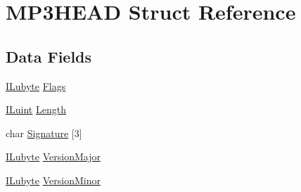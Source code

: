 \hypertarget{struct_m_p3_h_e_a_d}{\section{M\-P3\-H\-E\-A\-D Struct Reference}
\label{struct_m_p3_h_e_a_d}
}
\subsection*{Data Fields}
\begin{DoxyCompactItemize}
\item 
\hyperlink{il_8h_a8d2f04500100a86d1b00e98ab1b15a33}{I\-Lubyte} \hyperlink{struct_m_p3_h_e_a_d_a4d4e57f611ec63d5199ee6ea1c56077e}{Flags}
\item 
\hyperlink{il_8h_ac6508d0e9c19e32f32e00d54b5b8cf30}{I\-Luint} \hyperlink{struct_m_p3_h_e_a_d_a3ed5d34564fb19b1d2884d37b6143e6a}{Length}
\item 
char \hyperlink{struct_m_p3_h_e_a_d_a2c30715aae62a2021a31a25528482eb8}{Signature} \mbox{[}3\mbox{]}
\item 
\hyperlink{il_8h_a8d2f04500100a86d1b00e98ab1b15a33}{I\-Lubyte} \hyperlink{struct_m_p3_h_e_a_d_a09c1cb5a9a8550d5971986d9464355fd}{Version\-Major}
\item 
\hyperlink{il_8h_a8d2f04500100a86d1b00e98ab1b15a33}{I\-Lubyte} \hyperlink{struct_m_p3_h_e_a_d_a3b5c207ac380f188549f369420f68cfe}{Version\-Minor}
\end{DoxyCompactItemize}


